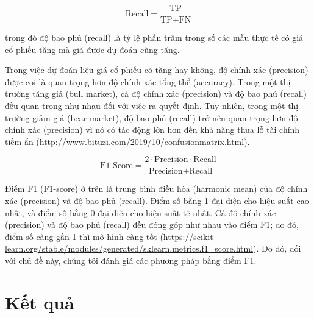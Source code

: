 $$
\text{Recall} = \frac{\text{TP}}{\text{TP}+\text{FN}}
$$

trong đó độ bao phủ (recall) là tỷ lệ phần trăm trong số các mẫu thực tế có giá cổ phiếu tăng mà giá được dự đoán cũng tăng.

Trong việc dự đoán liệu giá cổ phiếu có tăng hay không, độ chính xác (precision) được coi là quan trọng hơn độ chính xác tổng thể (accuracy). Trong một thị trường tăng giá (bull market), cả độ chính xác (precision) và độ bao phủ (recall) đều quan trọng như nhau đối với việc ra quyết định. Tuy nhiên, trong một thị trường giảm giá (bear market), độ bao phủ (recall) trở nên quan trọng hơn độ chính xác (precision) vì nó có tác động lớn hơn đến khả năng thua lỗ tài chính tiềm ẩn (\url{http://www.bituzi.com/2019/10/confusionmatrix.html}).

$$
\text{F1 Score} = \frac{2 \cdot \text{Precision} \cdot \text{Recall}}{\text{Precision} + \text{Recall}}
$$

Điểm F1 (F1-score) ở trên là trung bình điều hòa (harmonic mean) của độ chính xác (precision) và độ bao phủ (recall). Điểm số bằng 1 đại diện cho hiệu suất cao nhất, và điểm số bằng 0 đại diện cho hiệu suất tệ nhất. Cả độ chính xác (precision) và độ bao phủ (recall) đều đóng góp như nhau vào điểm F1; do đó, điểm số càng gần 1 thì mô hình càng tốt (\url{https://scikit-learn.org/stable/modules/generated/sklearn.metrics.f1_score.html}). Do đó, đối với chủ đề này, chúng tôi đánh giá các phương pháp bằng điểm F1.

\section{Kết quả}

